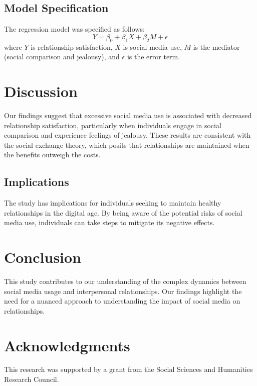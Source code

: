 \documentclass[12pt,a4paper]{article}
\begin{document}
\subsection{Model Specification}
The regression model was specified as follows:
\[ Y = \beta_0 + \beta_1X + \beta_2M + \epsilon \]
where $Y$ is relationship satisfaction, $X$ is social media use, $M$ is the mediator (social comparison and jealousy), and $\epsilon$ is the error term.

\section{Discussion}
Our findings suggest that excessive social media use is associated with decreased relationship satisfaction, particularly when individuals engage in social comparison and experience feelings of jealousy. These results are consistent with the social exchange theory, which posits that relationships are maintained when the benefits outweigh the costs.

\subsection{Implications}
The study has implications for individuals seeking to maintain healthy relationships in the digital age. By being aware of the potential risks of social media use, individuals can take steps to mitigate its negative effects.

\section{Conclusion}
This study contributes to our understanding of the complex dynamics between social media usage and interpersonal relationships. Our findings highlight the need for a nuanced approach to understanding the impact of social media on relationships.

\section*{Acknowledgments}
This research was supported by a grant from the Social Sciences and Humanities Research Council.
\end{document}
